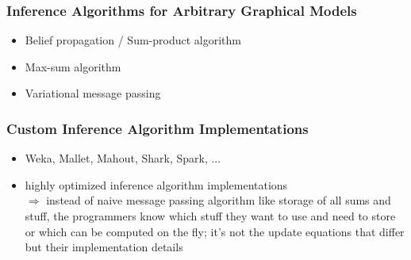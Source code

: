 \subsubsection{Inference Algorithms for Arbitrary Graphical Models}

\begin{itemize}
\item Belief propagation / Sum-product algorithm
\item Max-sum algorithm
\item Variational message passing
\end{itemize}

\subsubsection{Custom Inference Algorithm Implementations}
\label{subsec:custom-inference}

\begin{itemize}
\item Weka, Mallet, Mahout, Shark, Spark, ...
\item highly optimized inference algorithm implementations\\
$\Rightarrow$ instead of naive message passing algorithm like storage of all sums and stuff, the programmers know which stuff they want to use and need to store or which can be computed on the fly; it's not the update equations that differ but their implementation details
\end{itemize}


